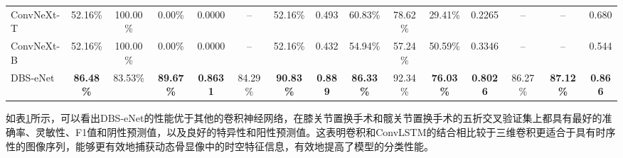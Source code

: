 \begin{table}[htbp]
{\begin{tabular}{lcccccccccccccc}
      ConvNeXt-T  & 52.16\%                            & 100.00\%                           & 0.00\%           & 0.0000          & –                & 52.16\%          & 0.493          & 60.83\%          & 78.62\%          & 29.41\%          & 0.2265          & –                & –                & 0.680          \\
      ConvNeXt-B  & 52.16\%                            & 100.00\%                           & 0.00\%           & 0.0000          & –                & 52.16\%          & 0.432          & 54.94\%          & 57.24\%          & 50.59\%          & 0.3346          & –                & –                & 0.544          \\
      DBS-eNet    & \textbf{86.48\%}                   & 83.53\%                            & \textbf{89.67\%} & \textbf{0.8631} & 84.29\%          & \textbf{90.83\%} & \textbf{0.889} & \textbf{86.33\%} & 92.34\%          & \textbf{76.03\%} & \textbf{0.8026} & 86.27\%          & \textbf{87.12\%} & \textbf{0.866} \\
      \bottomrule
    \end{tabular}
  }
  \label{tab:chap03_DBS-eNet_vs_CNN}
\end{table}

如表\ref{tab:chap03_DBS-eNet_vs_CNN}所示，可以看出DBS-eNet的性能优于其他的卷积神经网络，在膝关节置换手术和髋关节置换手术的五折交叉验证集上都具有最好的准确率、灵敏性、F1值和阴性预测值，以及良好的特异性和阳性预测值。这表明卷积和ConvLSTM的结合相比较于三维卷积更适合于具有时序性的图像序列，能够更有效地捕获动态骨显像中的时空特征信息，有效地提高了模型的分类性能。

